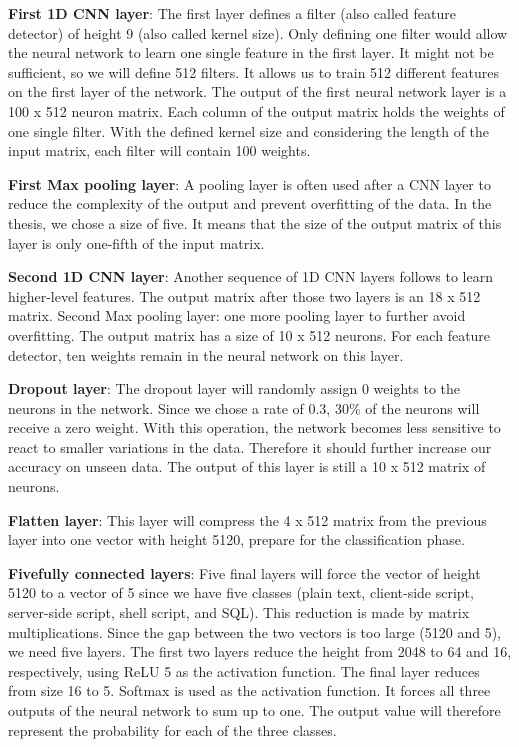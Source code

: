 \textbf{First 1D CNN layer}: The first layer defines a filter (also called feature detector) of height 9 (also called kernel size). Only defining one filter would allow the neural network to learn one single feature in the first layer. It might not be sufficient, so we will define 512 filters. It allows us to train 512 different features on the first layer of the network. The output of the first neural network layer is a 100 x 512 neuron matrix. Each column of the output matrix holds the weights of one single filter. With the defined kernel size and considering the length of the input matrix, each filter will contain 100 weights. 

\textbf{First Max pooling layer}: A pooling layer is often used after a CNN layer to reduce the complexity of the output and prevent overfitting of the data. In the thesis, we chose a size of five. It means that the size of the output matrix of this layer is only one-fifth of the input matrix. 

\textbf{Second 1D CNN layer}: Another sequence of 1D CNN layers follows to learn higher-level features. The output matrix after those two layers is an 18 x 512 matrix. 
Second Max pooling layer: one more pooling layer to further avoid overfitting. The output matrix has a size of 10 x 512 neurons. For each feature detector, ten weights remain in the neural network on this layer. 

\textbf{Dropout layer}: The dropout layer will randomly assign 0 weights to the neurons in the network. Since we chose a rate of 0.3, 30\% of the neurons will receive a zero weight. With this operation, the network becomes less sensitive to react to smaller variations in the data. Therefore it should further increase our accuracy on unseen data. The output of this layer is still a 10 x 512 matrix of neurons. 

\textbf{Flatten layer}: This layer will compress the 4 x 512 matrix from the previous layer into one vector with height 5120, prepare for the classification phase. 

\textbf{Fivefully connected layers}: Five final layers will force the vector of height 5120 to a vector of 5 since we have five classes (plain text, client-side script, server-side script, shell script, and SQL). This reduction is made by matrix multiplications. Since the gap between the two vectors is too large (5120 and 5), we need five layers. The first two layers reduce the height from 2048 to 64 and 16, respectively, using ReLU 5 as the activation function. The final layer reduces from size 16 to 5. Softmax is used as the activation function. It forces all three outputs of the neural network to sum up to one. The output value will therefore represent the probability for each of the three classes.

